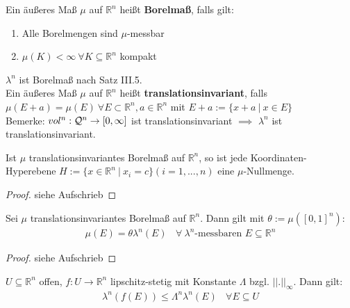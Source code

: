 \documentclass[11pt,a4paper,fleqn,openany]{report}
\begin{document}

    \begin{definition}
      Ein äußeres Maß $\mu$ auf $\mathbb{R}^n$ heißt \textbf{Borelmaß}, falls gilt:
      \begin{enumerate}
        \item Alle Borelmengen sind $\mu$-messbar
        \item $\mu(K)<\infty \ \forall K \subseteq \mathbb{R}^n$ kompakt
      \end{enumerate}
    \end{definition}

    \begin{remark}
      $\lambda^n$ ist Borelmaß nach Satz III.5.\\
      Ein äußeres Maß $\mu$ auf $\mathbb{R}^n$ heißt \textbf{translationsinvariant}, falls \\
      $\mu(E + a) = \mu(E) \ \forall E \subset \mathbb{R}^n, a \in \mathbb{R}^n$ mit $E + a := \{x + a \ | \ x \in E\}$\\
      Bemerke: $vol^n:\mathcal{Q}^n \to [0, \infty]$ ist translationsinvariant $\implies$ $\lambda^n$ ist translationsinvariant.
    \end{remark}

    \begin{lemma}
      Ist $\mu$ translationsinvariantes Borelmaß auf $\mathbb{R}^n$, so ist jede Koordinaten-Hyperebene $H := \{x \in \mathbb{R}^n \ | \ x_i = c\} (i=1,...,n)$ eine $\mu$-Nullmenge.
    \end{lemma}

    \begin{proof}
      siehe Aufschrieb
    \end{proof}

    \begin{theorem}
      Sei $\mu$ translationsinvariantes Borelmaß auf $\mathbb{R}^n$. Dann gilt mit $\theta := \mu([0,1]^n)$:
      \begin{align*}
        \mu(E) = \theta \lambda^n(E) \ \ \ \ \forall \ \lambda^n \text{-messbaren } E \subseteq \mathbb{R}^n
      \end{align*}
    \end{theorem}

    \begin{proof}
      siehe Aufschrieb
    \end{proof}

    \begin{lemma}
      $U \subseteq \mathbb{R}^n$ offen, $f: U \to \mathbb{R}^n$ lipschitz-stetig mit Konstante $\Lambda$ bzgl. $||.||_{\infty}$. Dann gilt:
      \begin{align*}
        \lambda^n(f(E)) \leq \Lambda^n \lambda^n(E) \ \ \ \ \forall E \subseteq U
      \end{align*}
    \end{lemma}
\end{document}
